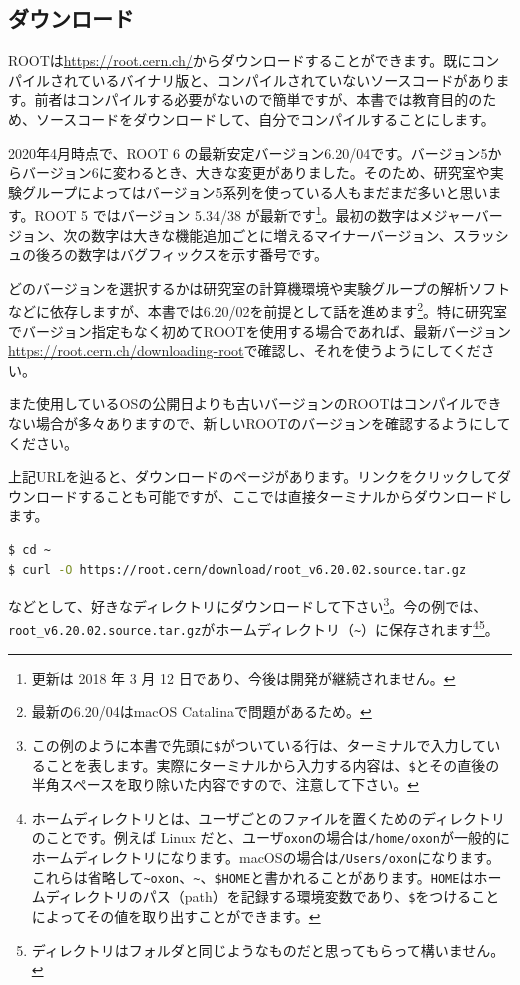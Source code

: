 \subsection{ダウンロード}
\label{subsec:download}
ROOTは\url{https://root.cern.ch/}からダウンロードすることができます。既にコンパイルされているバイナリ版と、コンパイルされていないソースコードがあります。前者はコンパイルする必要がないので簡単ですが、本書では教育目的のため、ソースコードをダウンロードして、自分でコンパイルすることにします。

2020年4月時点で、ROOT 6 の最新安定バージョン6.20/04です。バージョン5からバージョン6に変わるとき、大きな変更がありました。そのため、研究室や実験グループによってはバージョン5系列を使っている人もまだまだ多いと思います。ROOT 5 ではバージョン 5.34/38 が最新です\footnote{更新は 2018 年 3 月 12 日であり、今後は開発が継続されません。}。最初の数字はメジャーバージョン、次の数字は大きな機能追加ごとに増えるマイナーバージョン、スラッシュの後ろの数字はバグフィックスを示す番号です。

どのバージョンを選択するかは研究室の計算機環境や実験グループの解析ソフトなどに依存しますが、本書では6.20/02を前提として話を進めます\footnote{最新の6.20/04はmacOS Catalinaで問題があるため。}。特に研究室でバージョン指定もなく初めてROOTを使用する場合であれば、最新バージョン\url{https://root.cern.ch/downloading-root}で確認し、それを使うようにしてください。

また使用しているOSの公開日よりも古いバージョンのROOTはコンパイルできない場合が多々ありますので、新しいROOTのバージョンを確認するようにしてください。

上記URLを辿ると、ダウンロードのページがあります。リンクをクリックしてダウンロードすることも可能ですが、ここでは直接ターミナルからダウンロードします。
\begin{lstlisting}[language=bash]
$ cd ~
$ curl -O https://root.cern/download/root_v6.20.02.source.tar.gz
\end{lstlisting}
などとして、好きなディレクトリにダウンロードして下さい\footnote{この例のように本書で先頭に\texttt{\$}がついている行は、ターミナルで入力していることを表します。実際にターミナルから入力する内容は、\texttt{\$}とその直後の半角スペースを取り除いた内容ですので、注意して下さい。}。今の例では、\texttt{root\_v6.20.02.source.tar.gz}がホームディレクトリ（\texttt{\~}）に保存されます\footnote{ホームディレクトリとは、ユーザごとのファイルを置くためのディレクトリのことです。例えば Linux だと、ユーザ\texttt{oxon}の場合は\texttt{/home/oxon}が一般的にホームディレクトリになります。macOSの場合は\texttt{/Users/oxon}になります。これらは省略して\texttt{{\textasciitilde}oxon}、\texttt{\textasciitilde}、\texttt{\$HOME}と書かれることがあります。\texttt{HOME}はホームディレクトリのパス（path）を記録する環境変数であり、\texttt{\$}をつけることによってその値を取り出すことができます。}\footnote{ディレクトリはフォルダと同じようなものだと思ってもらって構いません。}。

